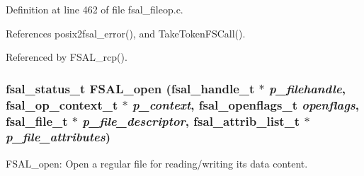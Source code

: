 Definition at line 462 of file fsal\_\-fileop.c.

References posix2fsal\_\-error(), and TakeTokenFSCall().

Referenced by FSAL\_\-rcp().
\subsubsection[{FSAL\_\-open}]{\setlength{\rightskip}{0pt plus 5cm}fsal\_\-status\_\-t FSAL\_\-open (fsal\_\-handle\_\-t $\ast$ {\em p\_\-filehandle}, \/  fsal\_\-op\_\-context\_\-t $\ast$ {\em p\_\-context}, \/  fsal\_\-openflags\_\-t {\em openflags}, \/  fsal\_\-file\_\-t $\ast$ {\em p\_\-file\_\-descriptor}, \/  fsal\_\-attrib\_\-list\_\-t $\ast$ {\em p\_\-file\_\-attributes})}\label{fsal__fileop_8c_5cf83ccd864da024deda59cab7d4264a}


FSAL\_\-open: Open a regular file for reading/writing its data content.


